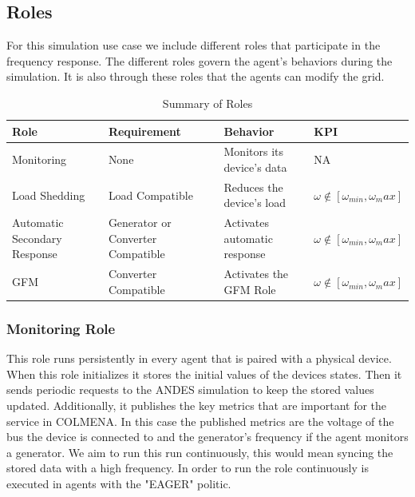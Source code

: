 \documentclass{article}
\begin{document}
\subsection{Roles}

For this simulation use case we include different roles that participate in the frequency response. The different roles govern the agent's behaviors during the simulation. It is also through these roles that the agents can modify the grid.  



\begin{table}[h]
    \centering
    \small %
    \renewcommand{\arraystretch}{1.2} %
    \begin{tabular}{|p{3cm}|p{3cm}|p{4cm}|p{4cm}|} %
    \hline
    Role & Requirement & Behavior & KPI \\
    \hline
    Monitoring & None & Monitors its device's data & NA\\
    Load Shedding & Load Compatible & Reduces the device's load & $\omega \notin [\omega_{min},  \omega_max]$\\
    Automatic Secondary Response & Generator or Converter Compatible& Activates automatic response & $\omega \notin [\omega_{min},  \omega_max]$\\
    GFM & Converter Compatible & Activates the GFM Role & $\omega \notin [\omega_{min},  \omega_max]$\\
    \hline
    \end{tabular}
    \caption{Summary of Roles}
    \label{tab:roles}
\end{table}

\subsubsection*{Monitoring Role}

This role runs persistently in every agent that is paired with a physical device. When this role initializes it stores the initial values of the devices states. Then it sends periodic requests to the ANDES simulation to keep the stored values updated. Additionally, it publishes the key metrics that are important for the service in COLMENA. In this case the published metrics are the voltage of the bus the device is connected to and the generator's frequency if the agent monitors a generator. We aim to run this run continuously, this would mean syncing the stored data with a high frequency. In order to run the role continuously is executed in agents with the "EAGER" politic.  
\end{document}
